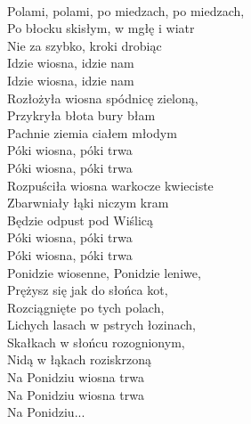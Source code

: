 
\tab{}\tab{}\\
Polami, polami, po miedzach, po miedzach, \\
Po błocku skisłym, w mgłę i wiatr \\
Nie za szybko, kroki drobiąc \tab{}\\
Idzie wiosna, idzie nam \tab{}\\
Idzie wiosna, idzie nam \tab{}\\
\hops
Rozłożyła wiosna spódnicę zieloną, \\
Przykryła błota bury błam \\
Pachnie ziemia ciałem młodym \\
Póki wiosna, póki trwa \\
Póki wiosna, póki trwa \\
\hops
Rozpuściła wiosna warkocze kwieciste \\
Zbarwniały łąki niczym kram \\
Będzie odpust pod Wiślicą \\
Póki wiosna, póki trwa \\
Póki wiosna, póki trwa \\
\hops
Ponidzie wiosenne, Ponidzie leniwe,  \\
Prężysz się jak do słońca kot, \tab{}\\
Rozciągnięte po tych polach, \tab{}\\
Lichych lasach w pstrych łozinach, \\
Skałkach w słońcu rozognionym, \\
Nidą w łąkach roziskrzoną \tab{}\\
Na Ponidziu wiosna trwa \tab{}\\
Na Ponidziu wiosna trwa \tab{}\\
Na Ponidziu...  \tab{}\tab{}
